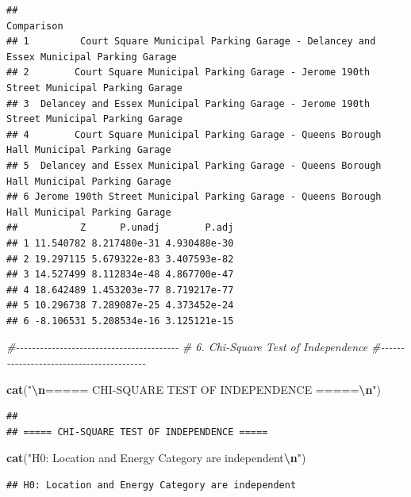 \documentclass[
  12pt,
]{article}
\newenvironment{Shaded}{\begin{snugshade}}{\end{snugshade}}
\newcommand{\CommentTok}[1]{\textcolor[rgb]{0.56,0.35,0.01}{\textit{#1}}}
\newcommand{\FunctionTok}[1]{\textcolor[rgb]{0.13,0.29,0.53}{\textbf{#1}}}
\newcommand{\NormalTok}[1]{#1}
\newcommand{\SpecialCharTok}[1]{\textcolor[rgb]{0.81,0.36,0.00}{\textbf{#1}}}
\newcommand{\StringTok}[1]{\textcolor[rgb]{0.31,0.60,0.02}{#1}}
\begin{document}
\begin{verbatim}
##                                                                                    Comparison
## 1         Court Square Municipal Parking Garage - Delancey and Essex Municipal Parking Garage
## 2        Court Square Municipal Parking Garage - Jerome 190th Street Municipal Parking Garage
## 3  Delancey and Essex Municipal Parking Garage - Jerome 190th Street Municipal Parking Garage
## 4        Court Square Municipal Parking Garage - Queens Borough Hall Municipal Parking Garage
## 5  Delancey and Essex Municipal Parking Garage - Queens Borough Hall Municipal Parking Garage
## 6 Jerome 190th Street Municipal Parking Garage - Queens Borough Hall Municipal Parking Garage
##           Z      P.unadj        P.adj
## 1 11.540782 8.217480e-31 4.930488e-30
## 2 19.297115 5.679322e-83 3.407593e-82
## 3 14.527499 8.112834e-48 4.867700e-47
## 4 18.642489 1.453203e-77 8.719217e-77
## 5 10.296738 7.289087e-25 4.373452e-24
## 6 -8.106531 5.208534e-16 3.125121e-15
\end{verbatim}

\begin{Shaded}
\begin{Highlighting}[]
\CommentTok{\#{-}{-}{-}{-}{-}{-}{-}{-}{-}{-}{-}{-}{-}{-}{-}{-}{-}{-}{-}{-}{-}{-}{-}{-}{-}{-}{-}{-}{-}{-}{-}{-}{-}{-}{-}{-}{-}{-}{-}{-}{-}}
\CommentTok{\# 6. Chi{-}Square Test of Independence}
\CommentTok{\#{-}{-}{-}{-}{-}{-}{-}{-}{-}{-}{-}{-}{-}{-}{-}{-}{-}{-}{-}{-}{-}{-}{-}{-}{-}{-}{-}{-}{-}{-}{-}{-}{-}{-}{-}{-}{-}{-}{-}{-}{-}}

\FunctionTok{cat}\NormalTok{(}\StringTok{"}\SpecialCharTok{\textbackslash{}n}\StringTok{===== CHI{-}SQUARE TEST OF INDEPENDENCE =====}\SpecialCharTok{\textbackslash{}n}\StringTok{"}\NormalTok{)}
\end{Highlighting}
\end{Shaded}

\begin{verbatim}
## 
## ===== CHI-SQUARE TEST OF INDEPENDENCE =====
\end{verbatim}

\begin{Shaded}
\begin{Highlighting}[]
\FunctionTok{cat}\NormalTok{(}\StringTok{"H0: Location and Energy Category are independent}\SpecialCharTok{\textbackslash{}n}\StringTok{"}\NormalTok{)}
\end{Highlighting}
\end{Shaded}

\begin{verbatim}
## H0: Location and Energy Category are independent
\end{verbatim}
\end{document}
